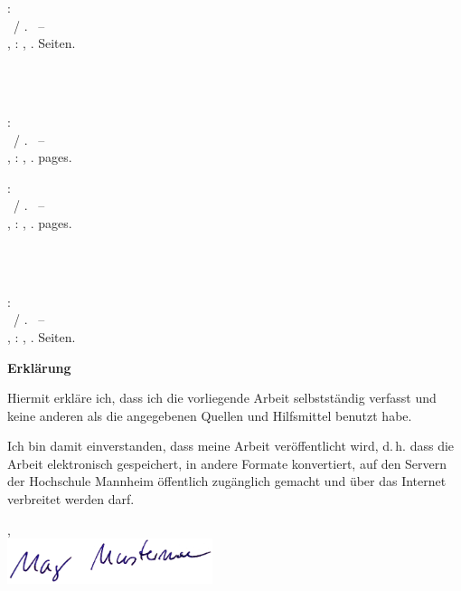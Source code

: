\null\newpage
\thispagestyle{empty}

\newcommand{\hsmabibde}{\begin{small}\textbf{\hsmaautorbib}: \\ \hsmatitelde \ / \hsmaautor. \ -- \\ \hsmatypde, \hsmaort : \hsmakoerperschaftde, \hsmajahr. \pageref{lastpage} Seiten.\end{small}}

\newcommand{\hsmabiben}{\begin{small}\textbf{\hsmaautorbib}: \\ \hsmatitelen \ / \hsmaautor. \ -- \\ \hsmatypen, \hsmaort : \hsmakoerperschaften, \hsmajahr. \pageref{lastpage} pages. \end{small}}

%
  {\hsmabibde \\ \vspace{0.5cm} \\ \hsmabiben}
  {\hsmabiben \\ \vspace{0.5cm} \\ \hsmabibde}

\clearpage\setcounter{page}{1}
\thispagestyle{empty}
\textsf{\large\textbf{Erklärung}}

Hiermit erkläre ich, dass ich die vorliegende Arbeit selbstständig verfasst und keine anderen als die angegebenen Quellen und Hilfsmittel benutzt habe.

%
{
\vspace{0.5cm}
Ich bin damit einverstanden, dass meine Arbeit veröffentlicht wird, d.\,h. dass die Arbeit elektronisch gespeichert, in andere Formate konvertiert, auf den Servern der Hochschule Mannheim öffentlich zugänglich gemacht und über das Internet verbreitet werden darf.
}{}%

\vspace{1cm}
\hsmaort, \hsmadatum \\

%
  {%
    \vspace{1.2cm}
  }%
  {%
    \includegraphics[width=6cm]{unterschrift.png}
  }%

